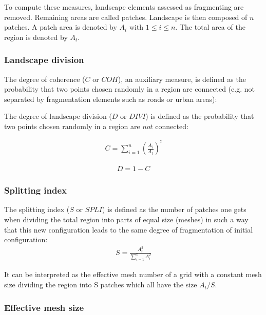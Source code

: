 \documentclass[11pt]{article}
\begin{document}
To compute these measures, landscape elements assessed as fragmenting are removed. Remaining areas are called patches. Landscape is then composed of $n$ patches. A patch area is denoted by $A_i$ with $1 \leq i \leq n$. The total area of the region is denoted by $A_t$.

\subsubsection{Landscape division}

The degree of coherence ($C$ or $COH$), an auxiliary measure, is defined as the probability that two points chosen randomly in a region are connected (e.g. not separated by fragmentation elements such as roads or urban areas):

The degree of landscape division ($D$ or $DIVI$) is defined as the probability that two points chosen randomly in a region are $not$ connected:

\hspace*{-0.5cm}
\begin{minipage}[c][1cm]{.46\linewidth}
\begin{align*}
C = \sum_{i=1}^{n}(\frac{A_{i}}{A_{t}})^{²}
\end{align*}
\end{minipage}
\begin{minipage}[c][1cm]{.46\linewidth}
\begin{align*}
D = 1 - C
\end{align*}
\end{minipage}

\subsubsection{Splitting index}

The  splitting index ($S$ or $SPLI$) is defined as the number of patches one gets when dividing the total region into parts of equal size (meshes) in such a way that this new configuration leads to the same degree of fragmentation of initial configuration:
\begin{align*}
S = \frac{A_{t}^{2}}{\sum_{i=1}^{n}A_{i}^{2}}
\end{align*}

It can be interpreted as the effective mesh number of a grid with a constant mesh size dividing the region into S patches which all have the size $A_{t} / S$.

\subsubsection{Effective mesh size}
\end{document}
